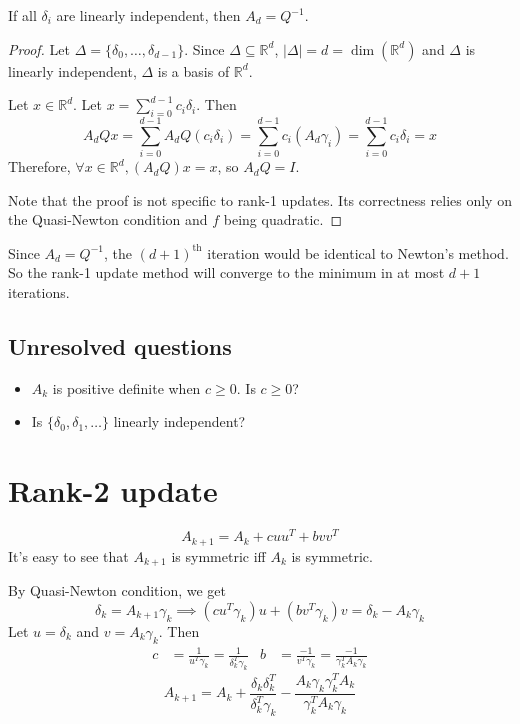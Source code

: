 \begin{lemma} \label{thm:delta-linindep-convergence}
If all $\delta_i$ are linearly independent, then $A_d = Q^{-1}$.
\end{lemma}
\begin{proof}
Let $\Delta = \{\delta_0, \ldots, \delta_{d-1}\}$.
Since $\Delta \subseteq \mathbb{R}^d$,
$|\Delta| = d = \dim(\mathbb{R}^d)$
and $\Delta$ is linearly independent, $\Delta$ is a basis of $\mathbb{R}^d$.

Let $x \in \mathbb{R}^d$. Let $x = \sum_{i=0}^{d-1} c_i\delta_i$. Then
\[ A_dQx
= \sum_{i=0}^{d-1} A_dQ(c_i\delta_i)
= \sum_{i=0}^{d-1} c_i(A_d\gamma_i)
= \sum_{i=0}^{d-1} c_i\delta_i
= x \]
Therefore, $\forall x \in \mathbb{R}^d, (A_dQ)x = x$, so $A_dQ = I$.

Note that the proof is not specific to rank-1 updates.
Its correctness relies only on the Quasi-Newton condition and $f$ being quadratic.
\end{proof}

Since $A_d = Q^{-1}$, the $(d+1)^{\textrm{th}}$ iteration
would be identical to Newton's method.
So the rank-1 update method will converge to the minimum in at most $d+1$ iterations.

\subsection{Unresolved questions}

\begin{itemize}
\item $A_k$ is positive definite when $c \ge 0$. Is $c \ge 0$?
\item Is $\{\delta_0, \delta_1, \ldots\}$ linearly independent?
\end{itemize}

\section{Rank-2 update}

\[ A_{k+1} = A_k + cuu^T + bvv^T \]
It's easy to see that $A_{k+1}$ is symmetric iff $A_k$ is symmetric.

By Quasi-Newton condition, we get
\[ \delta_k = A_{k+1}\gamma_k
\implies (cu^T\gamma_k)u + (bv^T\gamma_k)v = \delta_k - A_k\gamma_k \]
Let $u = \delta_k$ and $v = A_k\gamma_k$. Then
\begin{align*}
c &= \frac{1}{u^T\gamma_k} = \frac{1}{\delta_k^T\gamma_k}
& b &= \frac{-1}{v^T\gamma_k} = \frac{-1}{\gamma_k^TA_k\gamma_k}
\end{align*}
\[ A_{k+1} = A_k + \frac{\delta_k\delta_k^T}{\delta_k^T\gamma_k}
- \frac{A_k\gamma_k\gamma_k^TA_k}{\gamma_k^TA_k\gamma_k} \]


